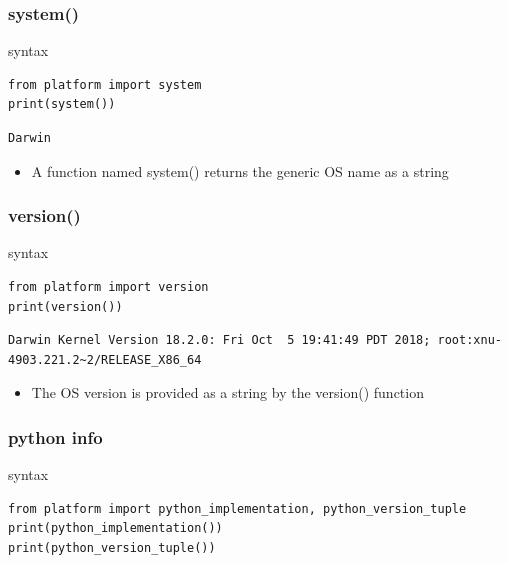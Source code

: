 \documentclass[11pt]{article}
\begin{document}
\subsubsection{system()}
\label{sec:orgc1ea588}
\begin{description}
\item[{syntax}] 
\end{description}
\begin{verbatim}
from platform import system
print(system())
\end{verbatim}

\begin{verbatim}
Darwin
\end{verbatim}

\begin{itemize}
\item A function named system() returns the generic OS name as a string
\end{itemize}

\subsubsection{version()}
\label{sec:org2d3967e}
\begin{description}
\item[{syntax}] 
\end{description}
\begin{verbatim}
from platform import version
print(version())
\end{verbatim}

\begin{verbatim}
Darwin Kernel Version 18.2.0: Fri Oct  5 19:41:49 PDT 2018; root:xnu-4903.221.2~2/RELEASE_X86_64
\end{verbatim}

\begin{itemize}
\item The OS version is provided as a string by the version() function
\end{itemize}

\subsubsection{python info}
\label{sec:org2bdc614}
\begin{description}
\item[{syntax}] 
\end{description}
\begin{verbatim}
from platform import python_implementation, python_version_tuple
print(python_implementation())
print(python_version_tuple())
\end{verbatim}
\end{document}
